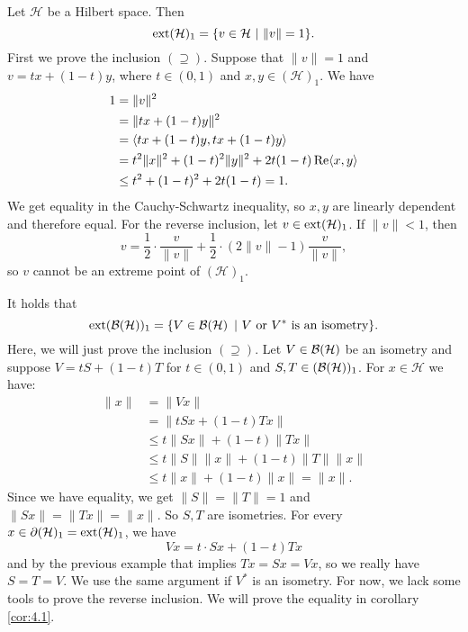\begin{example}
  Let $\mathcal{H}$ be a Hilbert space. Then 
  $$\operatorname{ext} (\mathcal{H})_1 = \{v \in \mathcal{H}\ |\ \|v\| = 1\}.$$
  First we prove the inclusion $(\supseteq)$. Suppose that 
  $\| v\| = 1$ and $v = tx + (1 - t)y$, where $t \in (0, 1)$ and $x, y \in (\mathcal{H})_1$.
  We have 
  \begin{align*}
    1 &= \| v\|^2\\
    &= \| tx + (1 - t)y\|^2\\
    &= \langle tx + (1 - t)y, tx + (1 - t)y \rangle\\
    &= t^2 \|x\|^2 + (1 - t)^2 \|y\|^2 + 2t(1 - t)\operatorname{Re} \langle x, y\rangle\\
    &\leq t^2 + (1 - t)^2 + 2t(1 - t) = 1.
  \end{align*}
  We get equality in the Cauchy-Schwartz inequality, so $x, y$ are linearly dependent and therefore equal.
  For the reverse inclusion, let $v \in \operatorname{ext} (\mathcal{H})_1$. If $\| v\| < 1$, then 
  $$v = \frac{1}{2} \cdot \frac{v}{\|v\|} + \frac{1}{2} \cdot \left(2{\|v\|} - 1 \right) \frac{v}{\|v\|},$$
  so $v$ cannot be an extreme point of $(\mathcal{H})_1$.
\end{example}

\begin{example}\label{ex:1.4}
  It holds that
  $$\operatorname{ext} (\operatorname{\mathcal{B} (\mathcal{H})})_1 = \{V \in \operatorname{\mathcal{B} (\mathcal{H})}\ |\ \textrm{$V$ or $V^*$ is an isometry}\}.$$
  Here, we will just prove the inclusion $(\supseteq)$.
  Let $V \in \operatorname{\mathcal{B} (\mathcal{H})}$  be an isometry and suppose $V = tS + (1 - t)T$
  for $t \in (0, 1)$ and $S, T \in (\operatorname{\mathcal{B} (\mathcal{H})})_1$.
  For $x \in \mathcal{H}$ we have:
  \begin{align*}
    \| x\| &= \| V x\|\\
    &= \| tSx + (1 - t)Tx\|\\
    &\leq t \|Sx\| + (1 - t) \|Tx\|\\
    &\leq t \| S\| \|x\| + (1 - t) \|T\| \|x\|\\
    &\leq t \|x\| + (1 - t)\|x\| = \|x\|. 
  \end{align*}
  Since we have equality, we get $\|S\| = \|T\| = 1$
  and $\|Sx\| = \|Tx\| = \|x\|$. So $S, T$ are isometries.
  For every $x \in \partial (\mathcal{H})_1 = \operatorname{ext} (\mathcal{H})_1$, we have 
  $$Vx = t \cdot Sx + (1 - t) Tx$$ and by the previous example that implies $Tx = Sx = Vx$,
  so we really have $S = T = V$. We use the same argument if $V^*$ is an isometry.
  For now, we lack some tools to prove the reverse inclusion. We will prove the equality in corollary \ref{cor:4.1}.
\end{example}

